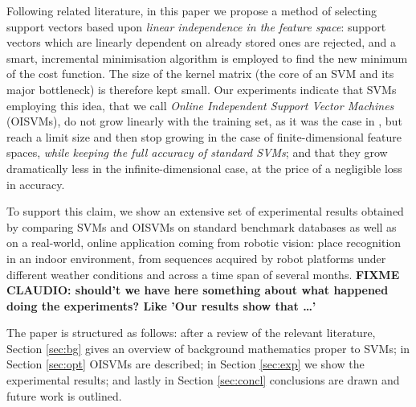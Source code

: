 Following related literature, in this paper we propose a method of
selecting support vectors based upon \emph{linear independence in the
feature space}: support vectors which are linearly dependent on
already stored ones are rejected, and a smart, incremental
minimisation algorithm is employed to find the new minimum of the cost
function. The size of the kernel matrix (the core of an
SVM and its major bottleneck) is therefore kept small. Our
experiments indicate that SVMs employing this idea, that we call
\emph{Online Independent Support Vector Machines} (OISVMs), do
not grow linearly with the training set, as it was the case in
\cite{Steinwart03}, but reach a limit size and then stop growing in
the case of finite-dimensional feature spaces, \emph{while keeping the
full accuracy of standard SVMs}; and that they grow dramatically less
in the infinite-dimensional case, at the price of a negligible loss in
accuracy.

To support this claim, we show an extensive set of experimental
results obtained by comparing SVMs and OISVMs on standard benchmark
databases as well as on a real-world, online application coming from
robotic vision: place recognition in an indoor environment, from
sequences acquired by robot platforms under different weather
conditions and across a time span of several months.
{\bf FIXME CLAUDIO: should't we have here something about what happened 
doing the experiments? Like 'Our results show that \ldots'}

The paper is structured as follows: after a review of the relevant literature,
 Section \ref{sec:bg}  gives an
overview of background mathematics proper to SVMs; in Section
\ref{sec:opt} OISVMs are described; in Section
\ref{sec:exp} we show the experimental results; and lastly in Section
\ref{sec:concl} conclusions are drawn and future work is outlined.
